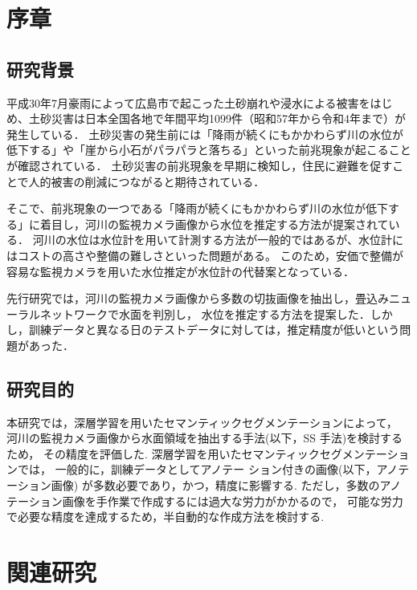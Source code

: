 \section{序章}
\subsection{研究背景}
\label{1.1}
平成30年7月豪雨によって広島市で起こった土砂崩れや浸水による被害をはじめ、土砂災害は日本全国各地で年間平均1099件（昭和57年から令和4年まで）が発生している\cite{mlit}．
土砂災害の発生前には「降雨が続くにもかかわらず川の水位が低下する」や「崖から小石がパラパラと落ちる」といった前兆現象が起こることが確認されている\cite{zentyou}．
土砂災害の前兆現象を早期に検知し，住民に避難を促すことで人的被害の削減につながると期待されている．

そこで、前兆現象の一つである「降雨が続くにもかかわらず川の水位が低下する」に着目し，河川の監視カメラ画像から水位を推定する方法が提案されている\cite{watanabe}．
河川の水位は水位計を用いて計測する方法が一般的ではあるが、水位計にはコストの高さや整備の難しさといった問題がある。
このため，安価で整備が容易な監視カメラを用いた水位推定が水位計の代替案となっている\cite{seman}．

先行研究\cite{watanabe}では，河川の監視カメラ画像から多数の切抜画像を抽出し，畳込みニューラルネットワークで水面を判別し，
水位を推定する方法を提案した．しかし，訓練データと異なる日のテストデータに対しては，推定精度が低いという問題があった．

\subsection{研究目的}
\label{1.2}
本研究では，深層学習を用いたセマンティックセグメンテーションによって，
河川の監視カメラ画像から水面領域を抽出する手法(以下，SS 手法)を検討するため，
その精度を評価した.
深層学習を用いたセマンティックセグメンテーションでは，
一般的に，訓練データとしてアノテー ション付きの画像(以下，アノテーション画像)
が多数必要であり，かつ，精度に影響する.
ただし，多数のアノテーション画像を手作業で作成するには過大な労力がかかるので，
可能な労力で必要な精度を達成するため，半自動的な作成方法を検討する.

\clearpage
\section{関連研究}
